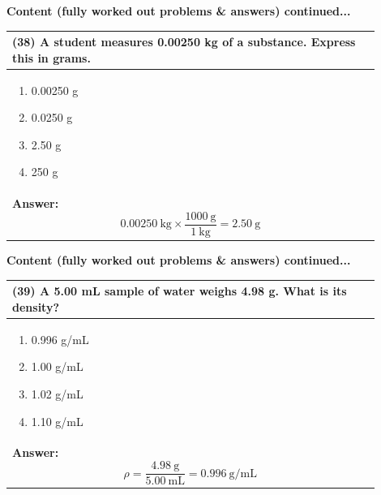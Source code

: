\documentclass{article}
\begin{document}
{\newpage
\noindent
{\large\textbf{Content (fully worked out problems \& answers) continued...}}\\[0.2em]
\vspace{0.2cm}
\begin{tabular}{|p{0.9\linewidth}|}
\hline
\vspace{0.2cm}
\textbf{(38)} A student measures 0.00250 kg of a substance. Express this in grams.\\
\hline
\vspace{0.2cm}
\begin{minipage}[t]{0.85\linewidth}
\begin{enumerate}[label=\alph*.]
\item 0.00250 g \
\item 0.0250 g \
\item 2.50 g \
\item 250 g 
\end{enumerate}
\end{minipage}\\
\hline
\vspace{0.2cm}
\textbf{Answer:} 
\[
0.00250~\text{kg} \times \frac{1000~\text{g}}{1~\text{kg}} = 2.50~\text{g}
\] \\ 
\hline
\end{tabular}

\newpage
\noindent
{\large\textbf{Content (fully worked out problems \& answers) continued...}}\\[0.2em]
\vspace{0.2cm}
\begin{tabular}{|p{0.9\linewidth}|}
\hline
\vspace{0.2cm}
\textbf{(39)} A 5.00 mL sample of water weighs 4.98 g. What is its density?\\
\hline
\vspace{0.2cm}
\begin{minipage}[t]{0.85\linewidth}
\begin{enumerate}[label=\alph*.]
\item 0.996 g/mL \
\item 1.00 g/mL \
\item 1.02 g/mL \ 
\item 1.10 g/mL 
\end{enumerate}
\end{minipage}\\
\hline
\vspace{0.2cm}
\textbf{Answer:} 
\[
\rho = \frac{4.98~\text{g}}{5.00~\text{mL}} = 0.996~\text{g/mL}
\] \\ 
\hline
\end{tabular}
\newpage

}
\end{document}
